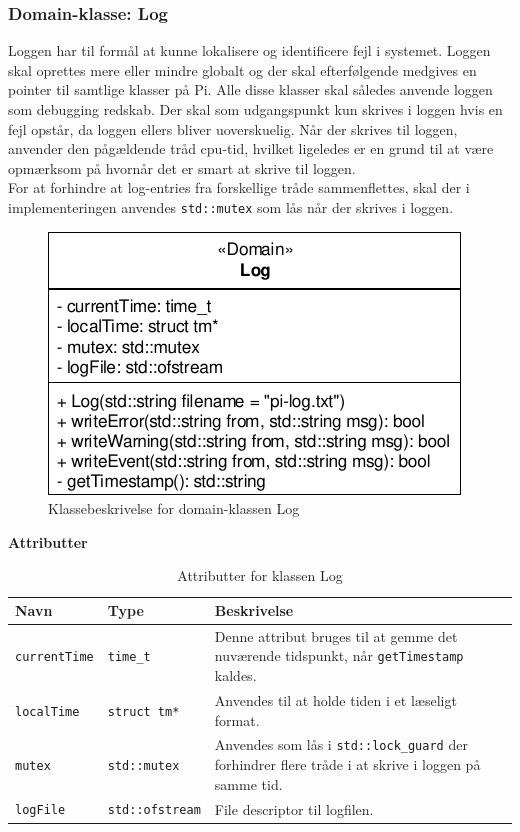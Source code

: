 \subsubsection{Domain-klasse: Log}

Loggen har til formål at kunne lokalisere og identificere fejl i systemet. Loggen skal oprettes mere eller mindre globalt og der skal efterfølgende medgives en pointer til samtlige klasser på Pi. Alle disse klasser skal således anvende loggen som debugging redskab. Der skal som udgangspunkt kun skrives i loggen hvis en fejl opstår, da loggen ellers bliver uoverskuelig. Når der skrives til loggen, anvender den pågældende tråd cpu-tid, hvilket ligeledes er en grund til at være opmærksom på hvornår det er smart at skrive til loggen. \\
For at forhindre at log-entries fra forskellige tråde sammenflettes, skal der i implementeringen anvendes \texttt{std::mutex} som lås når der skrives i loggen.

\begin{figure}[h]
\centering
\includegraphics[]{../fig/diagrammer/bil/cd_log.pdf}
\caption{Klassebeskrivelse for domain-klassen Log}
\label{fig:cd_log}
\end{figure}

\textbf{Attributter}

\begin{table}[h]
\begin{tabularx}{\textwidth}{| Z | Z | L{10cm} |} \hline
Navn & Type & Beskrivelse \\\hline

\texttt{currentTime} & \texttt{time\_t} &Denne attribut bruges til at gemme det nuværende tidspunkt, når \texttt{getTimestamp} kaldes. \\\hline

\texttt{localTime} & \texttt{struct tm*} & Anvendes til at holde tiden i et læseligt format. \\\hline

\texttt{mutex} & \texttt{std::mutex} & Anvendes som lås i \texttt{std::lock\_guard} der forhindrer flere tråde i at skrive i loggen på samme tid. \\\hline

\texttt{logFile} & \texttt{std::ofstream} & File descriptor til logfilen. \\\hline

\end{tabularx}
\caption{Attributter for klassen Log}
\label{table:attr_log}
\end{table}


